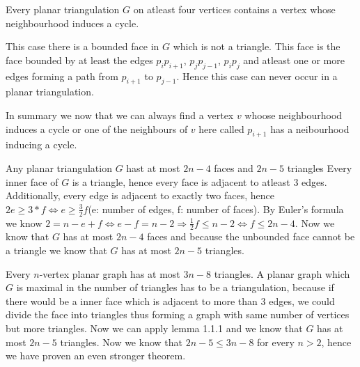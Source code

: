\documentclass[a4paper]{article}
\begin{document}
\begin{solution}{21}
\begin{theorem}{Every planar triangulation $G$ on atleast four vertices contains a vertex whose neighbourhood induces a cycle.}
\begin{itemize}
				This case there is a bounded face in $G$ which is not a triangle. 
				This face is the face bounded by at least the edges $p_ip_{i+1}$, $p_j p_{j-1}$, $p_i p_j$ and atleast one or more edges forming a path from $p_{i+1}$ to $p_{j-1}$. 
				Hence this case can never occur in a planar triangulation. 
		\end{itemize} 
		 In summary we now that we can always find a vertex $v$ whoose neighbourhood induces a cycle or one of the neighbours of $v$ here called $p_{i+1}$ has a neibourhood inducing a cycle.  
		\end{theorem}
		
		\begin{lemma}{Any planar triangulation $G$ hast at most $2n-4$ faces and $2n-5$ triangles}
		Every inner face of $G$ is a triangle, hence every face is adjacent to atleast 3 edges. 
		Additionally, every edge is adjacent to exactly two faces, hence $2e \geq 3*f  \Leftrightarrow e \geq \frac{3}{2} f $(e: number of edges, f: number of faces). 
		By Euler's formula we know $2 = n-e+f \Leftrightarrow e - f = n - 2 \Rightarrow \frac{1}{2} f \leq n - 2 \Leftrightarrow f  \leq 2n - 4$. 
		Now we know that $G$ has at most $2n-4$ faces and because the unbounded face cannot be a triangle we know that $G$ has at most $2n-5$ triangles. 
		\end{lemma}
		\begin{theorem}{Every $n$-vertex planar graph has at most $3n-8$ triangles.}
		A planar graph which $G$ is maximal in the number of triangles has to be a triangulation, because if there would be a inner face which is adjacent to more than 3 edges, we could divide the face into triangles thus forming a graph with same number of vertices but more triangles. 
		Now we can apply lemma 1.1.1 and we know that $G$ has at most $2n - 5$ triangles. 
		Now we know that $2n-5 \leq 3n-8$ for every $n > 2$, hence we have proven an even stronger theorem.  
		\end{theorem}
	\end{solution}
	\newpage
	\begin{solution}{22}
		
	\end{solution}
	
\end{document}
